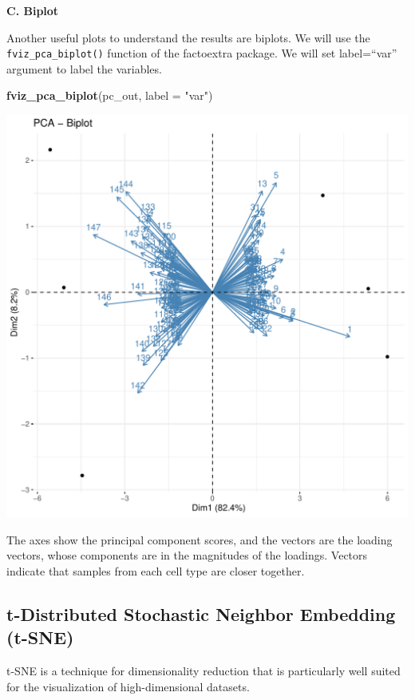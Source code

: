 \documentclass[
]{book}
\newenvironment{Shaded}{\begin{snugshade}}{\end{snugshade}}
\newcommand{\AttributeTok}[1]{\textcolor[rgb]{0.13,0.29,0.53}{#1}}
\newcommand{\FunctionTok}[1]{\textcolor[rgb]{0.13,0.29,0.53}{\textbf{#1}}}
\newcommand{\NormalTok}[1]{#1}
\newcommand{\StringTok}[1]{\textcolor[rgb]{0.31,0.60,0.02}{#1}}
\begin{document}
\textbf{C. Biplot}

Another useful plots to understand the results are biplots. We will use the \texttt{fviz\_pca\_biplot()} function of the factoextra package. We will set label=``var'' argument to label the variables.

\begin{Shaded}
\begin{Highlighting}[]
\FunctionTok{fviz\_pca\_biplot}\NormalTok{(pc\_out, }\AttributeTok{label =} \StringTok{"var"}\NormalTok{)}
\end{Highlighting}
\end{Shaded}

\includegraphics{_main_files/figure-latex/unnamed-chunk-51-1.pdf}

The axes show the principal component scores, and the vectors are the loading vectors, whose components are in the magnitudes of the loadings. Vectors indicate that samples from each cell type are closer together.

\subsection{t-Distributed Stochastic Neighbor Embedding (t-SNE)}\label{t-distributed-stochastic-neighbor-embedding-t-sne}

t-SNE is a technique for dimensionality reduction that is particularly well suited for the visualization of high-dimensional datasets.
\end{document}
